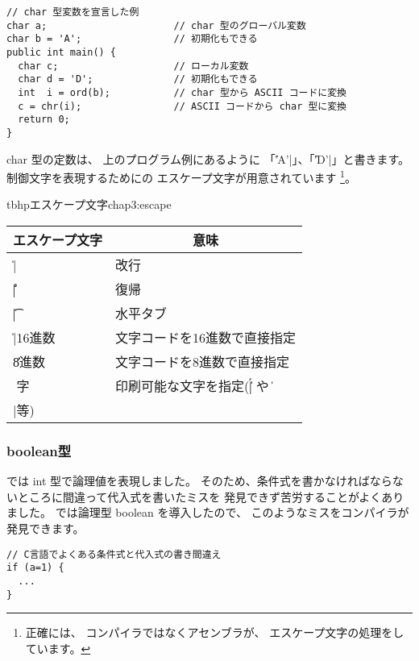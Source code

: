 \begin{mylist}
\begin{verbatim}
// char 型変数を宣言した例
char a;                      // char 型のグローバル変数
char b = 'A';                // 初期化もできる
public int main() {
  char c;                    // ローカル変数
  char d = 'D';              // 初期化もできる
  int  i = ord(b);           // char 型から ASCII コードに変換
  c = chr(i);                // ASCII コードから char 型に変換
  return 0;
}
\end{verbatim}
\end{mylist}

char 型の定数は、
上のプログラム例にあるように 「\|'A'|」、「\|'D'|」と書きます。
制御文字を表現するためにの
エスケープ文字が用意されています
\footnote{正確には、
コンパイラではなくアセンブラが、
エスケープ文字の処理をしています。}。


\begin{mytable}{tbhp}{エスケープ文字}{chap3:escape}
\begin{tabular}{ll}
\hline
\multicolumn{1}{c}{エスケープ文字} & \multicolumn{1}{c}{意味} \\
\hline
\|\n| & 改行 \\
\|\r| & 復帰 \\
\|\t| & 水平タブ \\
\|\x|16進数 & 文字コードを16進数で直接指定 \\
\|\|8進数 & 文字コードを8進数で直接指定 \\
\|\|文字 & 印刷可能な文字を指定(\|\'| や \|\\|等) \\
\hline
\end{tabular}
\end{mytable}

\subsubsection{boolean型}

\cl では int 型で論理値を表現しました。
そのため、条件式を書かなければならないところに間違って代入式を書いたミスを
発見できず苦労することがよくありました。
\cmml では論理型 boolean を導入したので、
このようなミスをコンパイラが発見できます。

\begin{mylist}
\begin{verbatim}
// C言語でよくある条件式と代入式の書き間違え
if (a=1) {
  ...
}
\end{verbatim}
\end{mylist}

